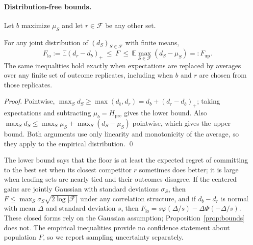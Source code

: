 \documentclass[runningheads]{llncs}
\newcommand{\Hpre}{H_{\mathrm{pre}}}
\begin{document}
\paragraph{Distribution-free bounds.} Let $b$ maximize $\mu_S$ and let $r\in\mathcal F$ be any other set.
\begin{proposition}\label{prop:bounds}
For any joint distribution of $(d_S)_{S\in\mathcal F}$ with finite means,
\begin{equation}
 F_{\mathrm{lo}}:=\mathbb E(d_r-d_b)_+\ \le\ F\ \le\ \mathbb E\max_{S\in\mathcal F}(d_S-\mu_S)=:F_{\mathrm{up}} .\label{eq:bounds}
\end{equation}
The same inequalities hold exactly when expectations are replaced by averages over any finite set of outcome replicates, including when $b$ and $r$ are chosen from those replicates.
\end{proposition}
\begin{proof}
Pointwise, $\max_S d_S\ge\max(d_b,d_r)=d_b+(d_r-d_b)_+$; taking expectations and subtracting $\mu_b=\Hpre$ gives the lower bound. Also $\max_S d_S\le\max_S\mu_S+\max_S(d_S-\mu_S)$ pointwise, which gives the upper bound. Both arguments use only linearity and monotonicity of the average, so they apply to the empirical distribution. \qed
\end{proof}
The lower bound says that the floor is at least the expected regret of committing to the best set when its closest competitor $r$ sometimes does better; it is large when leading sets are nearly tied and their outcomes disagree. If the centered gains are jointly Gaussian with standard deviations $\sigma_S$, then $F\le\max_S\sigma_S\sqrt{2\log|\mathcal F|}$ under any correlation structure, and if $d_b-d_r$ is normal with mean $\Delta$ and standard deviation $s$, then $F_{\mathrm{lo}}=s\varphi(\Delta/s)-\Delta\Phi(-\Delta/s)$. These closed forms rely on the Gaussian assumption; Proposition~\ref{prop:bounds} does not. The empirical inequalities provide no confidence statement about population $F$, so we report sampling uncertainty separately.
\end{document}
